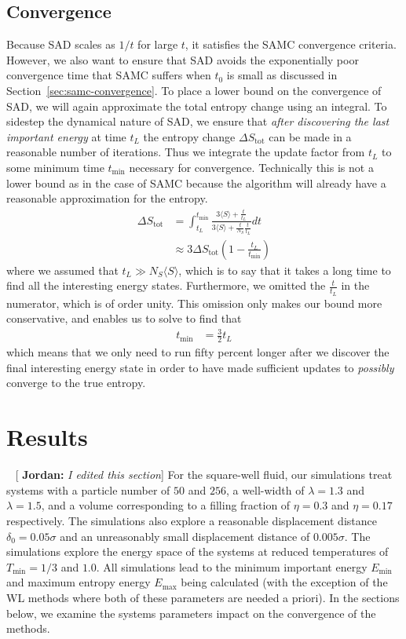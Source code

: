 \documentclass[letterpaper,twocolumn,amsmath,amssymb,pre,aps,10pt]{revtex4-1}
\newcommand{\blue}[1]{{\bf \color{blue} #1}}
\newcommand{\jpsays}[1]{{\color{red} [\blue{Jordan:} \emph{#1}]}}
\begin{document}
\subsection{Convergence}
Because SAD scales as $1/t$ for large $t$, it satisfies the SAMC
convergence criteria.  However, we also want to ensure that SAD avoids
the exponentially poor convergence time that SAMC suffers when $t_0$ is
small as discussed in Section~\ref{sec:samc-convergence}.
To place a lower bound on the convergence of SAD, we will again
approximate the total entropy change using an integral.  To sidestep
the dynamical nature of SAD, we ensure that \emph{after discovering the
last important energy} at time $t_L$ the entropy change
$\Delta S_{\text{tot}}$ can be made in a reasonable number of iterations.
Thus we integrate the update factor from $t_L$ to some minimum time
$t_{\min}$ necessary for convergence.  Technically this is not a lower
bound as in the case of SAMC because the algorithm will already have a
reasonable approximation for the entropy.
\begin{align}
\Delta S_{\text{tot}} &= \int_{t_L}^{t_{\min}}
     \frac{
       3\langle S\rangle + \frac{t}{t_L}
     }{
       3\langle S\rangle + \frac{t}{N_S}\frac{t}{t_L}
     } dt \\
&\approx 3\Delta S_{\text{tot}} \left(1-\frac{t_L}{t_{\min}}\right)
\end{align}
where we assumed that $t_L\gg N_S\langle S\rangle$, which is to say
that it takes a long time to find all the interesting energy states.
Furthermore, we omitted the $\frac{t}{t_L}$ in the numerator, which is
of order unity.  This omission only makes our bound more conservative,
and enables us to solve to find that
\begin{align}
  t_{\min} &= \frac32 t_L
\end{align}
which means that we only need to run fifty percent longer after we
discover the final interesting energy state in order to have made
sufficient updates to \emph{possibly} converge to the true entropy.

\section{Results}\label{sec:results}

~\jpsays{I edited this section}
For the square-well fluid, our simulations treat systems with a particle number
of $50$ and $256$, a well-width of $\lambda = 1.3$ and $\lambda = 1.5$, and a volume
corresponding to a
filling fraction of $\eta = 0.3$ and $\eta = 0.17$ respectively. The simulations
also explore a reasonable displacement distance $\delta_0 = 0.05\sigma$ and
an unreasonably small displacement distance of $0.005\sigma$. The simulations explore the
energy space of the systems at reduced temperatures of
$T_{\text{min}} = 1/3$ and $1.0$.  All simulations lead to the minimum important
energy $E_{\min}$ and maximum entropy energy $E_{\max}$
being calculated (with the exception of the WL methods where both
of these parameters are needed a priori).  In the sections below, we
examine the systems parameters impact on the convergence of the methods.
\end{document}
